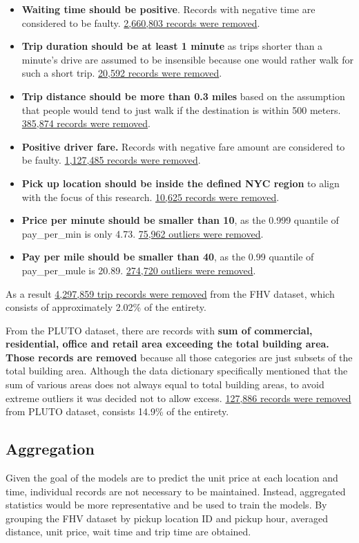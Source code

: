 \documentclass[11pt]{article}
\begin{document}
\begin{itemize} 
    \item \textbf{Waiting time should be positive}. Records with negative time are considered to be faulty. \ul{2,660,803 records were removed}. 
    \item \textbf{Trip duration should be at least 1 minute} as trips shorter than a minute's drive are assumed to be insensible because one would rather walk for such a short trip. \ul{20,592 records were removed}. 
    \item \textbf{Trip distance should be more than 0.3 miles} based on the assumption that people would tend to just walk if the destination is within 500 meters. \ul{385,874 records were removed}. 
    \item \textbf{Positive driver fare.} Records with negative fare amount are considered to be faulty. \ul{1,127,485 records were removed}. 
    \item \textbf{Pick up location should be inside the defined NYC region} to align with the focus of this research. \ul{10,625 records were removed}. 
    \item \textbf{Price per minute should be smaller than 10}, as the 0.999 quantile of pay\_per\_min is only 4.73. \ul{75,962 outliers were removed}. 
    \item \textbf{Pay per mile should be smaller than 40}, as the 0.99 quantile of pay\_per\_mule is 20.89. \ul{274,720 outliers were removed}. 
\end{itemize} 

As a result \ul{4,297,859 trip records were removed} from the FHV dataset, which consists of approximately 2.02\% of the entirety.

From the PLUTO dataset, there are records with \textbf{sum of commercial, residential, office and retail area exceeding the total building area. Those records are removed} because all those categories are just subsets of the total building area. Although the data dictionary specifically mentioned that the sum of various areas does not always equal to total building areas, to avoid extreme outliers it was decided not to allow excess. 
\ul{127,886 records were removed} from PLUTO dataset, consists 14.9\% of the entirety. 

\subsection{Aggregation}
Given the goal of the models are to predict the unit price at each location and time, individual records are not necessary to be maintained. Instead, aggregated statistics would be more representative and be used to train the models. By grouping the FHV dataset by pickup location ID and pickup hour, averaged distance, unit price, wait time and trip time are obtained.
\end{document}
